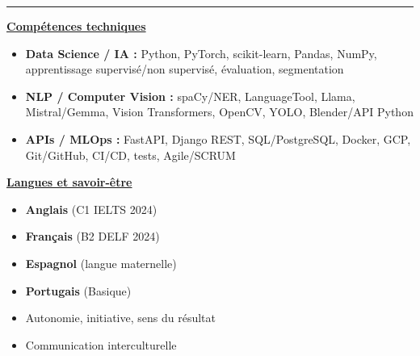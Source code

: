 \documentclass[letterpaper,10pt]{article}
\begin{document}
  

\vspace{4pt}
\noindent\rule{\textwidth}{0.4pt}
\vspace{1pt}

\noindent
\begin{minipage}[t]{0.64\textwidth}
  \raggedright
  \textbf{\underline{Compétences techniques}}\\[-2pt]
  {\scriptsize
    \begin{itemize}[leftmargin=*,itemsep=1pt,parsep=0pt,topsep=0pt,partopsep=0pt]
      \item \textbf{Data Science / IA :} Python, PyTorch, scikit-learn, Pandas, NumPy, apprentissage supervisé/non supervisé, évaluation, segmentation
      \item \textbf{NLP / Computer Vision :} spaCy/NER, LanguageTool, Llama, Mistral/Gemma, Vision Transformers, OpenCV, YOLO, Blender/API Python
      \item \textbf{APIs / MLOps :} FastAPI, Django REST, SQL/PostgreSQL, Docker, GCP, Git/GitHub, CI/CD, tests, Agile/SCRUM
    \end{itemize}
  }
\end{minipage}\hfill
\begin{minipage}[t]{0.33\textwidth}
  \raggedright
  \textbf{\underline{Langues et savoir-être}}\\[-2pt]
  {\scriptsize
    \begin{itemize}[leftmargin=*,itemsep=0pt,parsep=0pt,topsep=0pt,partopsep=0pt]
      \item \textbf{Anglais} (C1 \textendash{} IELTS 2024)
      \item \textbf{Français} (B2 \textendash{} DELF 2024)
      \item \textbf{Espagnol} (langue maternelle)
      \item \textbf{Portugais} (Basique)
      \item Autonomie, initiative, sens du résultat
      \item Communication interculturelle
    \end{itemize}
  }
\end{minipage}



\end{document}
